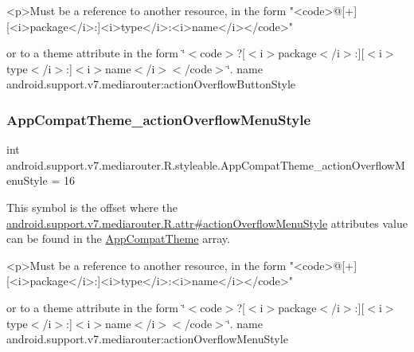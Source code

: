\begin{DoxyVerb}      <p>Must be a reference to another resource, in the form "<code>@[+][<i>package</i>:]<i>type</i>:<i>name</i></code>"
\end{DoxyVerb}
 or to a theme attribute in the form \char`\"{}$<$code$>$?\mbox{[}$<$i$>$package$<$/i$>$\+:\mbox{]}\mbox{[}$<$i$>$type$<$/i$>$\+:\mbox{]}$<$i$>$name$<$/i$>$$<$/code$>$\char`\"{}.  name android.\+support.\+v7.\+mediarouter\+:action\+Overflow\+Button\+Style \mbox{\label{classandroid_1_1support_1_1v7_1_1mediarouter_1_1R_1_1styleable_a64e7ff0b0b48c4a78c68ba5fec7fe779}} 
\subsubsection{\texorpdfstring{App\+Compat\+Theme\+\_\+action\+Overflow\+Menu\+Style}{AppCompatTheme\_actionOverflowMenuStyle}}
{\footnotesize\ttfamily int android.\+support.\+v7.\+mediarouter.\+R.\+styleable.\+App\+Compat\+Theme\+\_\+action\+Overflow\+Menu\+Style = 16\hspace{0.3cm}{\ttfamily [static]}}

This symbol is the offset where the \hyperlink{classandroid_1_1support_1_1v7_1_1mediarouter_1_1R_1_1attr_af6ab1d41c5f2da64e25b8346917871c8}{android.\+support.\+v7.\+mediarouter.\+R.\+attr\#action\+Overflow\+Menu\+Style} attribute\textquotesingle{}s value can be found in the \hyperlink{classandroid_1_1support_1_1v7_1_1mediarouter_1_1R_1_1styleable_a4e3d3900c75d49aeb2f283cac00214d6}{App\+Compat\+Theme} array.

\begin{DoxyVerb}      <p>Must be a reference to another resource, in the form "<code>@[+][<i>package</i>:]<i>type</i>:<i>name</i></code>"
\end{DoxyVerb}
 or to a theme attribute in the form \char`\"{}$<$code$>$?\mbox{[}$<$i$>$package$<$/i$>$\+:\mbox{]}\mbox{[}$<$i$>$type$<$/i$>$\+:\mbox{]}$<$i$>$name$<$/i$>$$<$/code$>$\char`\"{}.  name android.\+support.\+v7.\+mediarouter\+:action\+Overflow\+Menu\+Style \mbox{\label{classandroid_1_1support_1_1v7_1_1mediarouter_1_1R_1_1styleable_ac7174a04e7b274cbb6fb345ebb1c514b}} 
